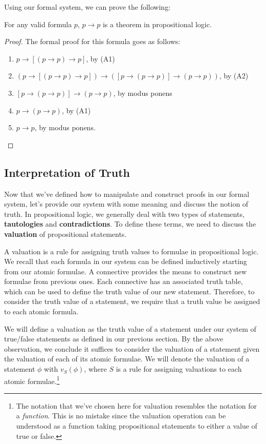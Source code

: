 Using our formal system, we can prove the following:

\begin{thm}
	For any valid formula $p$, $p\to p$ is a theorem in propositional logic.
\end{thm}
\begin{proof}
	The formal proof for this formula goes as follows:
	\begin{enumerate}
		\item $p \to [(p \to p) \to p]$, by (A1)
		\item $(p \to [ (p \to p) \to p]) \to ([p \to (p \to p)] \to (p \to p))$, by (A2)
		\item $[p \to (p \to p)] \to (p \to p)$, by modus ponens
		\item $p \to (p \to p)$, by (A1)
		\item $p \to p$, by modus ponens.
	\end{enumerate}
\end{proof}


\subsection{Interpretation of Truth}
Now that we've defined how to manipulate and construct proofs in our formal system, let's provide our system with some meaning and discuss the notion of truth.
In propositional logic, we generally deal with two types of statements, \textbf{tautologies} and \textbf{contradictions}.
To define these terms, we need to discuss the \textbf{valuation} of propositional statements.

A valuation is a rule for assigning truth values to formulae in propositional logic.
We recall that each formula in our system can be defined inductively starting from our atomic formulae.
A connective provides the means to construct new formulae from previous ones.
Each connective has an associated truth table, which can be used to define the truth value of our new statement.
Therefore, to consider the truth value of a statement, we require that a truth value be assigned to each atomic formula.

We will define a valuation as the truth value of a statement under our system of true/false statements as defined in our previous section.
By the above observation, we conclude it suffices to consider the valuation of a statement given the valuation of each of its atomic formulae.
We will denote the valuation of a statement $\phi$ with $v_S(\phi)$, where $S$ is a rule for assigning valuations to each atomic formulae.\footnote{
The notation that we've chosen here for valuation resembles the notation for a \textit{function}.
This is no mistake since the valuation operation can be understood as a function taking propositional statements to either a value of true or false.}

